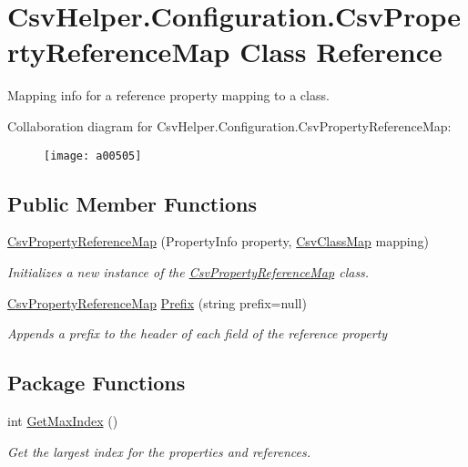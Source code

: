 \hypertarget{a00077}{\section{Csv\-Helper.\-Configuration.\-Csv\-Property\-Reference\-Map Class Reference}
\label{a00077}
}


Mapping info for a reference property mapping to a class.  




Collaboration diagram for Csv\-Helper.\-Configuration.\-Csv\-Property\-Reference\-Map\-:
\nopagebreak
\begin{figure}[H]
\begin{center}
\leavevmode
\texttt{[image: a00505]}
\end{center}
\end{figure}
\subsection*{Public Member Functions}
\begin{DoxyCompactItemize}
\item 
\hyperlink{a00077_a02823d2439667bca75233abbe81651ff}{Csv\-Property\-Reference\-Map} (Property\-Info property, \hyperlink{a00062}{Csv\-Class\-Map} mapping)
\begin{DoxyCompactList}\small\item\em Initializes a new instance of the \hyperlink{a00077}{Csv\-Property\-Reference\-Map} class. \end{DoxyCompactList}\item 
\hyperlink{a00077}{Csv\-Property\-Reference\-Map} \hyperlink{a00077_a0ed653de99ec2251fd99837740693789}{Prefix} (string prefix=null)
\begin{DoxyCompactList}\small\item\em Appends a prefix to the header of each field of the reference property \end{DoxyCompactList}\end{DoxyCompactItemize}
\subsection*{Package Functions}
\begin{DoxyCompactItemize}
\item 
int \hyperlink{a00077_a1e879f9a6ed84415ac52c44f1f086606}{Get\-Max\-Index} ()
\begin{DoxyCompactList}\small\item\em Get the largest index for the properties and references. \end{DoxyCompactList}\end{DoxyCompactItemize}
